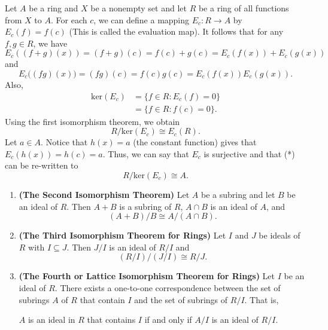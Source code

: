 \begin{eg}
   Let \( A  \) be a ring and \( X \) be a nonempty set and let \( R  \) be a ring of all functions from \( X  \) to \( A  \). For each \( c  \), we can define a mapping \( {E}_{c} : R \to A  \) by \( {E}_{c}(f) = f(c) \) (This is called the evaluation map). It follows that for any \( f,g \in R  \), we have 
   \[ {E}_{c}((f+g)(x)) = (f+g)(c) = f(c) + g(c) = {E}_{c}(f(x)) + {E}_{c}(g(x)) \]
   and
   \[  {E}_{c}\Big( (fg)(x) \Big) = (fg)(c) = f(c)g(c)  = {E}_{c}(f(x)) {E}_{c}(g(x)).\]
   Also,
   \begin{align*}
       \text{ker}({E}_{c}) &= \{ f \in R : {E}_{c}(f) = 0  \}  \\
                           &= \{ f \in R : f(c) = 0 \}.
   \end{align*}
   Using the first isomorphism theorem, we obtain
   \[  R / \text{ker}({E}_{c}) \cong {E}_{c}(R).  \tag{*}\]
   Let \( a \in A  \). Notice that \( h(x) = a  \) (the constant function) gives that \( {E}_{c}(h(x)) = h(c) = a  \). Thus, we can say that \( {E}_{c} \) is surjective and that (*) can be re-written to
   \[  R / \text{ker}({E}_{c}) \cong A.  \]
\end{eg}

\begin{theorem}
    \begin{enumerate}
        \item[(1)] \textbf{(The Second Isomorphism Theorem)} Let \( A  \) be a subring and let \( B  \) be an ideal of \( R  \). Then \( A + B  \) is a subring of \( R  \), \( A \cap B  \) is an ideal of \( A  \), and  
            \[  (A + B) / B  \cong A / (A \cap B). \]
        \item[(2)] \textbf{(The Third Isomorphism Theorem for Rings)}
            Let \( I  \) and \( J  \) be ideals of \( R  \) with \( I \subseteq J  \). Then \( J / I  \) is an ideal of \( R / I \) and \[ (R/ I) / (J / I) \cong R / J.  \]
        \item[(3)] \textbf{(The Fourth or Lattice Isomorphism Theorem for Rings)} Let \( I  \) be an ideal of \( R  \). There exists a one-to-one correspondence between the set of subrings \( A  \) of \( R  \) that contain \( I  \) and the set of subrings of \( R / I  \). That is,
            \begin{center}
                \( A  \) is an ideal in \( R  \) that contains \( I  \) if and only if \( A / I  \) is an ideal of \( R / I  \). 
            \end{center}
    \end{enumerate}
\end{theorem}

